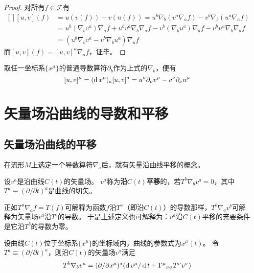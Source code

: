 \begin{proof}
对所有$f \in \mathscr{F}$有
$$\begin{aligned}[]
[u, v](f) & = u(v(f)) - v(u(f)) = u^b\nabla_b(v^a\nabla_af) - v^b\nabla_b(u^a\nabla_af) \\
& = u^b(\nabla_bv^a)\nabla_af + u^bv^a\nabla_b\nabla_af - v^b(\nabla_bu^a)\nabla_af - v^bu^a\nabla_b\nabla_af \\
& = (u^b\nabla_bv^a - v^b\nabla_bu^a)\nabla_af
\end{aligned}$$
而$[u, v](f) = [u, v]^a\nabla_af$，证毕。
\end{proof}

\begin{note}
取任一坐标系$\{x^\mu\}$的普通导数算符$\partial_b$作为上式的$\nabla_b$，便有
$$[u, v]^\mu = (\operatorname{d} x^\mu)_a[u, v]^a = u^\nu\partial_\nu v^\mu - v^\nu\partial_\nu u^\mu$$
\end{note}

\section{矢量场沿曲线的导数和平移}

\subsection{矢量场沿曲线的平移}
在流形$M$上选定一个导数算符$\nabla_a$后，就有矢量沿曲线平移的概念。

\begin{definition}
设$v^a$是沿曲线$C(t)$的矢量场。
$v^a$称为\textbf{沿$C(t)$平移}的，若$T^b\nabla_bv^a = 0$，其中$T^a \equiv (\partial / \partial t)^a$是曲线的切矢。
\end{definition}

正如$T^a\nabla_af = T(f)$可解释为函数$f$沿$T^a$（即沿$C(t)$）的导数那样，$T^b\nabla_av^b$可解释为矢量场$v^a$沿$T^b$的导数。
于是上述定义也可解释为：$v^a$沿$C(t)$平移的充要条件是它沿$T^b$的导数为零。

\begin{theorem}
设曲线$C(t)$位于坐标系$\{x^\mu\}$的坐标域内，曲线的参数式为$x^\mu(t)$。
令$T^a \equiv (\partial / \partial t)^a$，则沿$C(t)$的矢量场$v^a$满足
$$T^b\nabla_bv^a = (\partial / \partial x^\mu)^a(\operatorname{d} v^\mu / \operatorname{d} t + \Gamma^\mu{}_{\nu\sigma}T^\nu v^\sigma)$$
\end{theorem}

